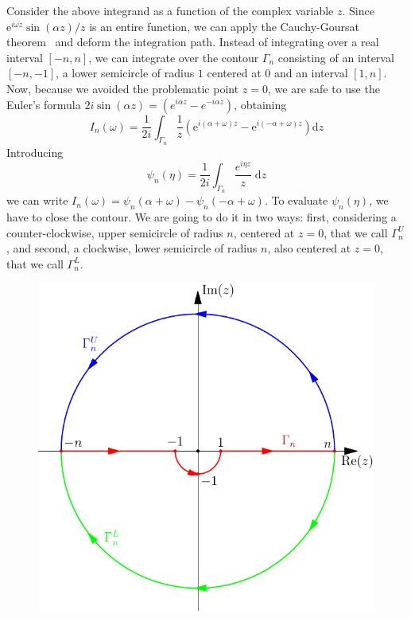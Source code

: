 Consider the above integrand as a function of the complex variable \(z\). Since \(\mathrm{e}^{i \omega  z}  \sin (\alpha z)/z\)
is an entire function, we can apply the Cauchy-Goursat theorem~\autocite{Byron1992} and deform the integration path.
Instead of integrating over a real interval \([-n,n]\), we can integrate over the contour \(\Gamma_n\) consisting of
an interval \([-n,-1]\), a lower semicircle of radius \(1\) centered at \(0\) and an interval \([1,n]\).
Now, because we avoided the problematic point \(z=0\), we are safe to use the Euler's formula
\(2i\sin (\alpha z) = \left( e^{i \alpha z} - e^{-i \alpha  z} \right) \), obtaining
\begin{equation}
    I_n(\omega ) = \frac{1}{2i} \int_{\Gamma_n} \frac{1}{z} \left( \mathrm{e}^{i (\alpha + \omega )z}- \mathrm{e}^{i(-\alpha + \omega )z}  \right)  \mathrm{d}z
\end{equation}
Introducing
\begin{equation}
    \psi_n(\eta ) = \frac{1}{2i} \int_{\Gamma_n} \frac{e^{i \eta z}}{z}\; \mathrm{d}z
\end{equation}
we can write \(I_n(\omega ) = \psi _n(\alpha +\omega ) - \psi _n (-\alpha + \omega )\). To evaluate \(\psi _n(\eta )\),
we have to close the contour. We are going to do it in two ways: first, considering a counter-clockwise, upper semicircle
of radius \(n\), centered at \(z=0\), that we call \(\Gamma_n^U\), and second, a clockwise, lower semicircle of radius \(n\),
also centered at \(z=0\), that we call \(\Gamma_n^L\).

\begin{figure}[H]
    \centering
    \includegraphics[width=0.8\linewidth]{Figures/contour2.pdf}
    \label{fig:contour_gamma_n2}
\end{figure}

